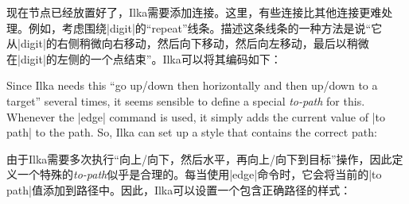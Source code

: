 现在节点已经放置好了，Ilka需要添加连接。这里，有些连接比其他连接更难处理。例如，考虑围绕|digit|的“repeat”线条。描述这条线条的一种方法是说“它从|digit|的右侧稍微向右移动，然后向下移动，然后向左移动，最后以稍微在|digit|的左侧的一个点结束”。Ilka可以将其编码如下：

%
\begin{codeexample}[preamble={\usetikzlibrary{calc,positioning,shapes.misc}}]
\end{codeexample}

Since Ilka needs this ``go up/down then horizontally and then up/down to a
target'' several times, it seems sensible to define a special \emph{to-path}
for this. Whenever the |edge| command is used, it simply adds the current value
of |to path| to the path. So, Ilka can set up a style that contains the correct
path:
%

由于Ilka需要多次执行“向上/向下，然后水平，再向上/向下到目标”操作，因此定义一个特殊的\emph{to-path}似乎是合理的。每当使用|edge|命令时，它会将当前的|to path|值添加到路径中。因此，Ilka可以设置一个包含正确路径的样式：


\begin{codeexample}[preamble={\usetikzlibrary{calc,positioning,shapes.misc}}]
\end{codeexample}

